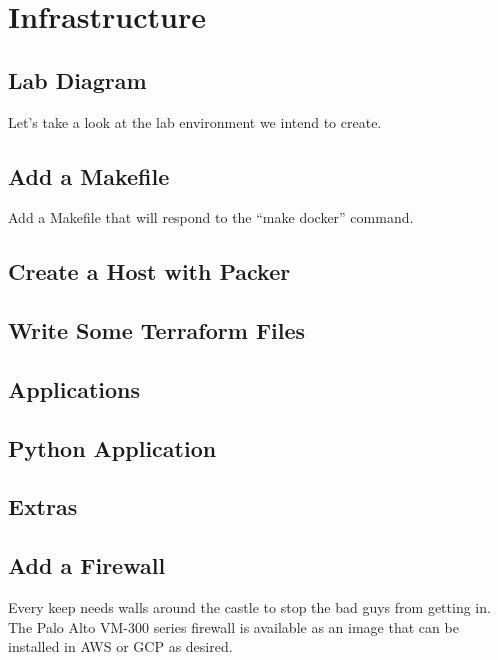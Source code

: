 \section{Infrastructure}

\subsection{Lab Diagram}
\justify{}
Let's take a look at the lab environment we intend to create.

\subsection{Add a Makefile}
\justify{}
Add a Makefile that will respond to the ``make docker'' command.

\subsection{Create a Host with Packer}

\subsection{Write Some Terraform Files}

\subsection{Applications}

\subsection{Python Application}

\subsection{Extras}

\subsection{Add a Firewall}
\justify{}
Every keep needs walls around the castle to stop the bad guys from
getting in. The Palo Alto VM-300 series firewall is available as an
image that can be installed in AWS or GCP as desired.
